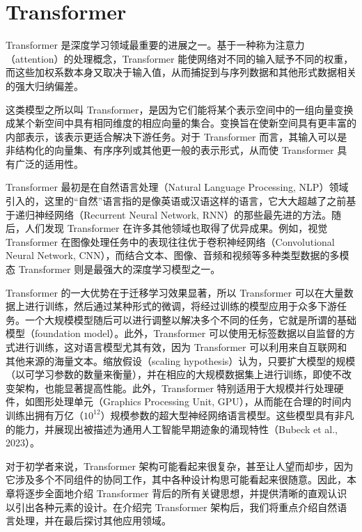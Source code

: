 \documentclass[../main.tex]{subfiles}
\begin{document}
\chapter{Transformer}\label{chapter:ch12-Transformer与注意力机制}

Transformer 是深度学习领域最重要的进展之一。基于一种称为注意力（attention）的处理概念，Transformer 能使网络对不同的输入赋予不同的权重，而这些加权系数本身又取决于输入值，从而捕捉到与序列数据和其他形式数据相关的强大归纳偏差。

这类模型之所以叫 Transformer，是因为它们能将某个表示空间中的一组向量变换成某个新空间中具有相同维度的相应向量的集合。变换旨在使新空间具有更丰富的内部表示，该表示更适合解决下游任务。对于 Transformer 而言，其输入可以是非结构化的向量集、有序序列或其他更一般的表示形式，从而使 Transformer 具有广泛的适用性。

Transformer 最初是在自然语言处理（Natural Language Processing, NLP）领域引入的，这里的“自然”语言指的是像英语或汉语这样的语言，它大大超越了之前基于递归神经网络（Recurrent Neural Network, RNN）的那些最先进的方法。随后，人们发现 Transformer 在许多其他领域也取得了优异成果。例如，视觉 Transformer 在图像处理任务中的表现往往优于卷积神经网络（Convolutional Neural Network, CNN），而结合文本、图像、音频和视频等多种类型数据的多模态 Transformer 则是最强大的深度学习模型之一。

Transformer 的一大优势在于迁移学习效果显著，所以 Transformer 可以在大量数据上进行训练，然后通过某种形式的微调，将经过训练的模型应用于众多下游任务。一个大规模模型随后可以进行调整以解决多个不同的任务，它就是所谓的基础模型（foundation model）。此外，Transformer 可以使用无标签数据以自监督的方式进行训练，这对语言模型尤其有效，因为 Transformer 可以利用来自互联网和其他来源的海量文本。缩放假设（scaling hypothesis）认为，只要扩大模型的规模（以可学习参数的数量来衡量），并在相应的大规模数据集上进行训练，即使不改变架构，也能显著提高性能。此外，Transformer 特别适用于大规模并行处理硬件，如图形处理单元（Graphics Processing Unit, GPU），从而能在合理的时间内训练出拥有万亿（$10^{12}$）规模参数的超大型神经网络语言模型。这些模型具有非凡的能力，并展现出被描述为通用人工智能早期迹象的涌现特性（Bubeck et al., 2023）。

对于初学者来说，Transformer 架构可能看起来很复杂，甚至让人望而却步，因为它涉及多个不同组件的协同工作，其中各种设计构思可能看起来很随意。因此，本章将逐步全面地介绍 Transformer 背后的所有关键思想，并提供清晰的直观认识以引出各种元素的设计。在介绍完 Transformer 架构后，我们将重点介绍自然语言处理，并在最后探讨其他应用领域。






\end{document}
